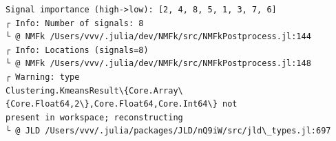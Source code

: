 \documentclass[11pt]{article}
\begin{document}
    \begin{center}
    \end{center}
    { \hspace*{\fill} \\}
    
    \begin{center}
    \end{center}
    { \hspace*{\fill} \\}
    
    \begin{Verbatim}[commandchars=\\\{\}]

    \end{Verbatim}

    \begin{center}
    \end{center}
    { \hspace*{\fill} \\}
    
    \begin{center}
    \end{center}
    { \hspace*{\fill} \\}
    
    \begin{Verbatim}[commandchars=\\\{\}]

    \end{Verbatim}

    \begin{center}
    \end{center}
    { \hspace*{\fill} \\}
    
    \begin{Verbatim}[commandchars=\\\{\}]
Signal importance (high->low): [2, 4, 8, 5, 1, 3, 7, 6]
┌ Info: Number of signals: 8
└ @ NMFk /Users/vvv/.julia/dev/NMFk/src/NMFkPostprocess.jl:144
┌ Info: Locations (signals=8)
└ @ NMFk /Users/vvv/.julia/dev/NMFk/src/NMFkPostprocess.jl:148
┌ Warning: type
Clustering.KmeansResult\{Core.Array\{Core.Float64,2\},Core.Float64,Core.Int64\} not
present in workspace; reconstructing
└ @ JLD /Users/vvv/.julia/packages/JLD/nQ9iW/src/jld\_types.jl:697
    \end{Verbatim}
\end{document}
